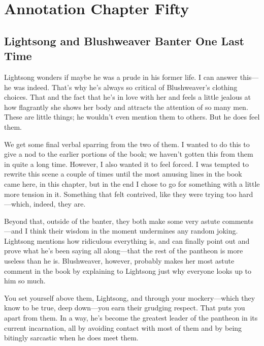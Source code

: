 \section{Annotation Chapter Fifty}

\subsection*{Lightsong and Blushweaver Banter One Last Time}

Lightsong wonders if maybe he was a prude in his former life. I can answer this—he was indeed. That’s why he’s always so critical of Blushweaver’s clothing choices. That and the fact that he’s in love with her and feels a little jealous at how flagrantly she shows her body and attracts the attention of so many men. These are little things; he wouldn’t even mention them to others. But he does feel them.

We get some final verbal sparring from the two of them. I wanted to do this to give a nod to the earlier portions of the book; we haven’t gotten this from them in quite a long time. However, I also wanted it to feel forced. I was tempted to rewrite this scene a couple of times until the most amusing lines in the book came here, in this chapter, but in the end I chose to go for something with a little more tension in it. Something that felt contrived, like they were trying too hard—which, indeed, they are.

Beyond that, outside of the banter, they both make some very astute comments—and I think their wisdom in the moment undermines any random joking. Lightsong mentions how ridiculous everything is, and can finally point out and prove what he’s been saying all along—that the rest of the pantheon is more useless than he is. Blushweaver, however, probably makes her most astute comment in the book by explaining to Lightsong just why everyone looks up to him so much.

You set yourself above them, Lightsong, and through your mockery—which they know to be true, deep down—you earn their grudging respect. That puts you apart from them. In a way, he’s become the greatest leader of the pantheon in its current incarnation, all by avoiding contact with most of them and by being bitingly sarcastic when he does meet them.




